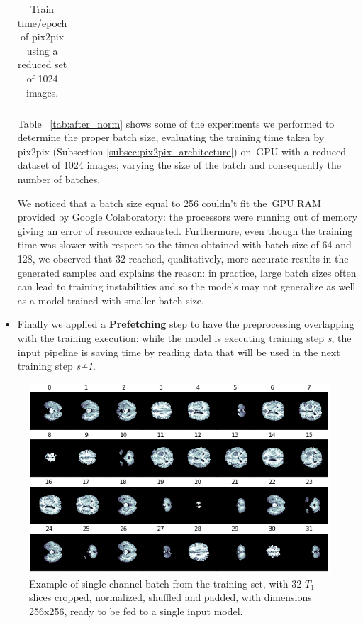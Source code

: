 \begin{itemize}
\begin{table}[htbp!]
\begin{tabular}{ccc}
\bottomrule	
\end{tabular}
\captionsetup{justification=centering}
\caption[Train time/epoch of pix2pix using a reduced set of 1024 images]{Train time/epoch of pix2pix using a reduced set of 1024 images.}
\label{tab:batch}
\end{table}

Table ~\ref{tab:after_norm} shows some of the experiments we performed to determine the proper batch size, evaluating the training time taken by pix2pix (Subsection \ref{subsec:pix2pix_architecture}) on~\ac{GPU} with a reduced dataset of 1024 images, varying the size of the batch and consequently the number of batches.
     
\vspace{2mm} %
We noticed that a batch size equal to 256 couldn't fit the~\ac{GPU} RAM provided by Google Colaboratory: the processors were running out of memory giving an error of resource exhausted.
Furthermore, even though the training time was slower with respect to the times obtained with batch size of 64 and 128, we observed that 32 reached, qualitatively, more accurate results in the generated samples and \cite[p.~681]{hands_on_ml} explains the reason: in practice, large batch sizes often can lead to training instabilities and so the models may not generalize as well as a model trained with smaller batch size. 

\item Finally we applied a \textbf{Prefetching} step to have the preprocessing overlapping with the training execution: while the model is executing training step \textit{s}, the input pipeline is saving time by reading data that will be used in the next training step \textit{s+1}.

\end{itemize}

\begin{figure}
\centering
\includegraphics[height=0.40\textheight]{images/batch.pdf}
\caption[A batch from training set: 32 $T_{1}$ processed slices]{Example of single channel batch from the training set, with 32 $T_{1}$ slices cropped, normalized, shuffled and padded, with dimensions 256x256, ready to be fed to a single input model.}
\label{fig:batch}
\end{figure}

